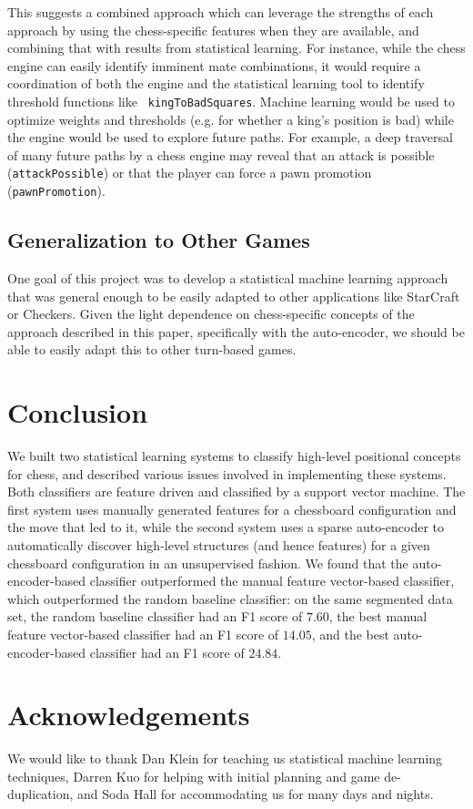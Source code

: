\documentclass[11pt]{article}
\begin{document}
This suggests a combined approach which can leverage the strengths of 
each approach by using the chess-specific features when they are 
available, and combining that with results from statistical learning. 
For instance, while the chess engine can easily identify imminent mate 
combinations, it would require a coordination of both the engine and the 
statistical learning tool to identify threshold functions like {\tt 
kingToBadSquares}. Machine learning would be used to optimize weights 
and thresholds (e.g. for whether a king's position is bad) while the 
engine would be used to explore future paths. For example, a deep 
traversal of many future paths by a chess engine may reveal that an 
attack is possible ({\tt attackPossible}) or that the player can force a 
pawn promotion ({\tt pawnPromotion}).

\subsection{Generalization to Other Games}
One goal of this project was to develop a statistical machine learning 
approach that was general enough to be easily adapted to other 
applications like StarCraft or Checkers. Given the light dependence on 
chess-specific concepts of the approach described in this paper, 
specifically with the auto-encoder, we should be able to easily adapt 
this to other turn-based games.

\section{Conclusion}
We built two statistical learning systems to classify high-level 
positional concepts for chess, and described various issues involved in 
implementing these systems. Both classifiers are feature driven and 
classified by a support vector machine. The first system uses manually 
generated features for a chessboard configuration and the move that led 
to it, while the second system uses a sparse auto-encoder to 
automatically discover high-level structures (and hence features) for a 
given chessboard configuration in an unsupervised fashion. We found that 
the auto-encoder-based classifier outperformed the manual feature 
vector-based classifier, which outperformed the random baseline 
classifier: on the same segmented data set, the random baseline 
classifier had an F1 score of $\mathbf{7.60}$, the best manual feature 
vector-based classifier had an F1 score of $\mathbf{14.05}$, and the 
best auto-encoder-based classifier had an F1 score of $\mathbf{24.84}$.

\section{Acknowledgements}
We would like to thank Dan Klein for teaching us statistical machine 
learning techniques, Darren Kuo for helping with initial planning and 
game de-duplication, and Soda Hall for accommodating us for many days 
and nights.



\end{document}
